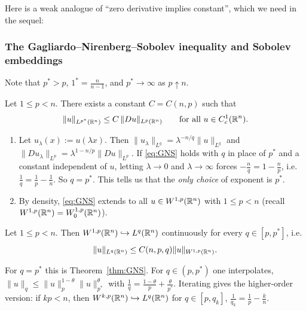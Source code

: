 Here is a weak analogue of ``zero derivative implies constant'', which we need in the sequel:

\subsubsection{The Gagliardo--Nirenberg--Sobolev inequality and Sobolev embeddings}
Note that $p^*>p$, $1^*=\frac{n}{n-1}$, and $p^*\to\infty$ as $p\uparrow n$.

\begin{theorem}\label{thm:GNS}
Let $1\leq p<n$. There exists a constant $C=C(n,p)$ such that
\begin{equation}\label{eq:GNS}
\|u\|_{L^{p^*}(\mathbb{R}^n)}\leq C\,\|Du\|_{L^p(\mathbb{R}^n)}\qquad\text{for all }u\in C_c^1(\mathbb{R}^n).
\end{equation}
\end{theorem}
\begin{remark}
\begin{enumerate}
    \item Let $u_\lambda(x):=u(\lambda x)$. Then $\|u_\lambda\|_{L^q}=\lambda^{-n/q}\|u\|_{L^q}$ and $\|Du_\lambda\|_{L^p}=\lambda^{1-n/p}\|Du\|_{L^p}$. If \eqref{eq:GNS} holds with $q$ in place of $p^*$ and a constant independent of $u$, letting $\lambda\to0$ and $\lambda\to\infty$ forces $-\frac nq=1-\frac np$, i.e. $\frac1q=\frac1p-\frac1n$. So $q=p^*$. This tells us that the \emph{only choice} of exponent is $p^*$.
    \item By density, \eqref{eq:GNS} extends to all $u\in W^{1,p}(\mathbb{R}^n)$ with $1\leq p<n$ (recall $W^{1,p}(\mathbb{R}^n)=W^{1,p}_0(\mathbb{R}^n)$).
\end{enumerate}
\end{remark}

\begin{theorem}\label{thm:sobolev_embedding_Rn}
Let $1\leq p<n$. Then $W^{1,p}(\mathbb{R}^n)\hookrightarrow L^q(\mathbb{R}^n)$ continuously for every $q\in[p,p^*]$, i.e.
$$\|u\|_{L^q(\mathbb{R}^n)}\leq C(n,p,q)\|u\|_{W^{1,p}(\mathbb{R}^n)}.$$
\end{theorem}
For $q=p^*$ this is Theorem~\ref{thm:GNS}. For $q\in(p,p^*)$ one interpolates, $\|u\|_q\leq\|u\|_p^{1-\theta}\|u\|_{p^*}^\theta$ with $\frac1q=\frac{1-\theta}p+\frac\theta{p^*}$. Iterating gives the higher-order version: if $kp<n$, then $W^{k,p}(\mathbb{R}^n)\hookrightarrow L^q(\mathbb{R}^n)$ for $q\in[p,q_k]$, $\frac1{q_k}=\frac1p-\frac kn$.

